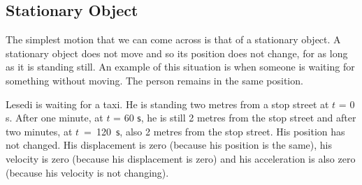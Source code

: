             \subsection*{Stationary Object}
            \nopagebreak
        \label{m38795*id69015}The simplest motion that we can come across is that of a stationary object. A stationary object does not move and so its position does not change, for as long as it is standing still.
An example of this situation is when someone is waiting for something without moving.
The person remains in the same position.\par 
        \label{m38795*id69021}Lesedi is waiting for a taxi. He is standing two metres from a stop street at $t$ = 0 s. After one minute, at $t$ = 60 $\mathsf{s}$, he is still 2 metres from the stop street and after two minutes, at $t$~=~120~$\mathsf{s}$, also 2 metres from the stop street. His position has not changed. His displacement is zero (because his position is the same), his velocity is zero (because his displacement is zero) and his acceleration is also zero (because his velocity is not changing).\par 
    \setcounter{subfigure}{0}
